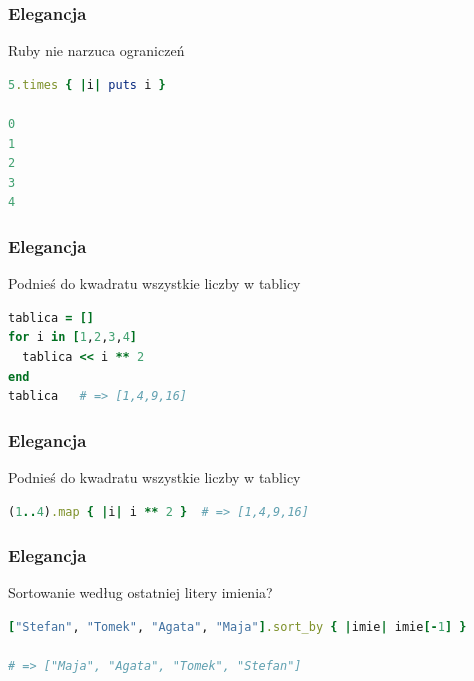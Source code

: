 
\begin{frame}[fragile]
\frametitle{Elegancja}
\begin{block}{Ruby nie narzuca ograniczeń}
\begin{lstlisting}[language=Ruby]
5.times { |i| puts i }

0
1
2
3
4
\end{lstlisting}
\end{block}
\end{frame}


\begin{frame}[fragile]
\frametitle{Elegancja}
\begin{block}{Podnieś do kwadratu wszystkie liczby w tablicy}
\begin{lstlisting}[language=Ruby]
tablica = []
for i in [1,2,3,4]
  tablica << i ** 2
end
tablica   # => [1,4,9,16]
\end{lstlisting}
\end{block}
\end{frame}

\begin{frame}[fragile]
\frametitle{Elegancja}
\begin{block}{Podnieś do kwadratu wszystkie liczby w tablicy}
\begin{lstlisting}[language=Ruby]
(1..4).map { |i| i ** 2 }  # => [1,4,9,16]
\end{lstlisting}
\end{block}
\end{frame}

\begin{frame}[fragile]
\frametitle{Elegancja}
\begin{block}{Sortowanie według ostatniej litery imienia?}
\begin{lstlisting}[language=Ruby,basicstyle=\tiny\ttfamily]
["Stefan", "Tomek", "Agata", "Maja"].sort_by { |imie| imie[-1] }

# => ["Maja", "Agata", "Tomek", "Stefan"]
\end{lstlisting}
\end{block}
\end{frame}

\begin{frame}[plain]
\end{frame}

